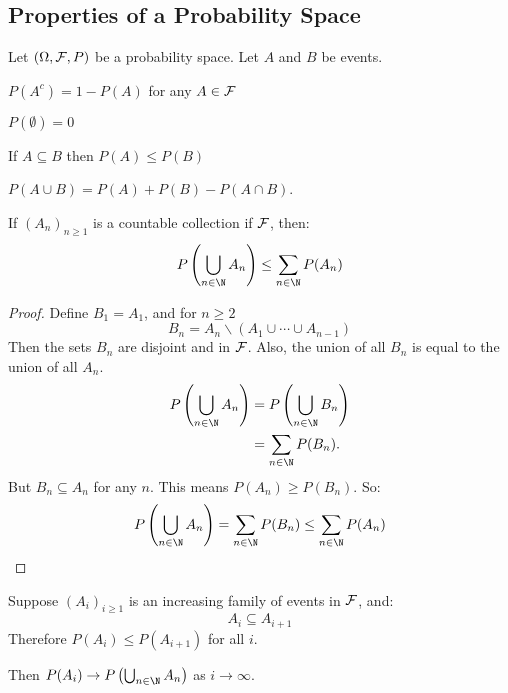 \documentclass[../Main.tex]{subfiles}
\begin{document}
\subsection{Properties of a Probability Space}
\begin{propositions} {
        Let $(\Omega, \mathcal{F}, P)$ be a probability space. Let $A$ and $B$ be events.
        \label{propsProbMeasure}
    }
    \item $P(A^c) = 1 - P(A)$ for any $A \in \mathcal{F}$ \label{propComplmentProb}
    \item $P(\emptyset) = 0$ \label{propPropEmpty}
    \item If $A \subseteq B$ then $P(A) \leq P(B)$ \label{propSubsetProbs}
    \item $P(A \cup B) = P(A) + P(B) - P(A \cap B)$. \label{propUnionProb}
\end{propositions}
\begin{proposition}
    If $(A_n)_{n \geq 1}$ is a countable collection if $\mathcal{F}$, then:
    \begin{align*}
        P\left(\bigcup_{n \in \N} A_n\right) \leq \sum_{n \in \N} P(A_n)
    \end{align*}
    \label{propUnionProbInequality}
\end{proposition}
\begin{proof}
    Define $B_1 = A_1$, and for $n \geq 2$
    \begin{equation*}
        B_n = A_n \backslash (A_1 \cup \cdots \cup A_{n-1})
    \end{equation*}
    Then the sets $B_n$ are disjoint and in $\mathcal{F}$. Also, the union of all $B_n$ is equal to the union of all $A_n$.
    \begin{align*}
        P\left(\bigcup_{n \in \N} A_n\right) &= P\left(\bigcup_{n \in \N} B_n \right) \\
        &= \sum_{n \in \N} P(B_n).
    \end{align*}
    But $B_n \subseteq A_n$ for any $n$. This means $P(A_n) \geq P(B_n)$. So:
    \begin{equation*}
        P\left(\bigcup_{n \in \N} A_n\right) = \sum_{n \in \N} P(B_n) \leq \sum_{n \in \N} P(A_n)
    \end{equation*}
\end{proof}
\begin{proposition}
    Suppose $(A_i)_{i \geq 1}$ is an increasing family of events in $\mathcal{F}$, and:
    \begin{equation*}
        A_i \subseteq A_{i+1}
    \end{equation*}
    Therefore $P(A_i) \leq P(A_{i+1})$ for all $i$.\par
    Then $P(A_i) \to P\left(\bigcup_{n \in \N} A_n\right)$ as $i \to \infty$.
    \label{propProbIncreasing}
\end{proposition}
\end{document}
